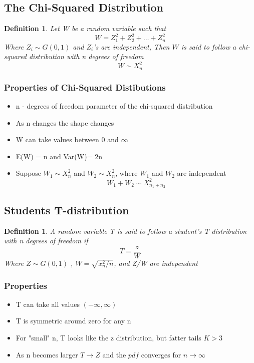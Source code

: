 \documentclass{article}
\newtheorem{definition}[theorem]{Definition}
\begin{document}
\subsection{The Chi-Squared Distribution}
\begin{definition} Let W be a random variable such that 
$$ W  = Z_1 ^2 + Z_2^2 + \ldots + Z_n^2 $$
Where \(Z_i \sim G(0,1)\) and \(Z_i\)'s are independent, Then \(W\) is said to follow a chi-squared distribution with n degrees of freedom 
$$ W \sim X^2_n $$ 
\end{definition}

\subsubsection*{Properties of Chi-Squared Distibutions}
\begin{itemize}
\item n - degrees of freedom parameter of the chi-squared distribution
\item As n changes the shape changes 
\item W can take values between 0 and \(\infty\)
\item E(W) = n and Var(W)= 2n
\item Suppose \(W_1 \sim X^2_n\) and \(W_2 \sim X^2_n\),  where \(W_1\) and \(W_2\) are independent 
$$ W_1 + W_2 \sim X^2_{n_1 + n_2} $$ 
\end{itemize}

\subsection{Students T-distribution}
\begin{definition}
A random variable T is said to follow a student's T distribution with n degrees of freedom if
$$ T = \frac{z}{W}$$
Where \(Z \sim G(0,1)\) , \(W = \sqrt{x^2_n / n}\), and Z/W are independent 
\end{definition}

\subsubsection*{Properties}
\begin{itemize}
\item T can take all values \((-\infty, \infty)\) 
\item T is symmetric around zero for any n 
\item For "small" n, T looks like the z distribution, but fatter tails \(K > 3\)
\item As n becomes larger \(T \longrightarrow Z\) and the \(pdf\) converges for \(n \longrightarrow \infty\)
\end{itemize}
\end{document}
